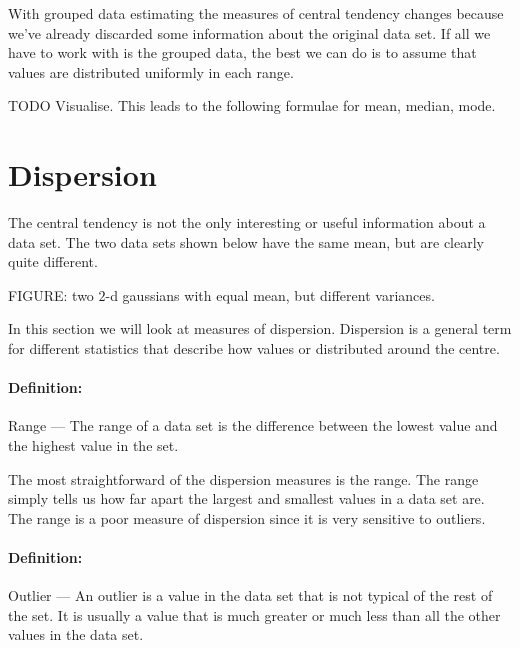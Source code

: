 \documentclass[a4paper,11pt]{report}
\def\Definition#1#2{\paragraph{Definition:} #1 --- #2}
\begin{document}
With grouped data estimating the measures of central tendency changes
because we've already discarded some information about the original
data set. If all we have to work with is the grouped data, the best we
can do is to assume that values are distributed uniformly in each
range.

TODO Visualise. This leads to the following formulae for mean,
median, mode.

\section{Dispersion}
The central tendency is not the only interesting or useful information
about a data set. The two data sets shown below have the same mean,
but are clearly quite different.

\begin{center}
  FIGURE: two $2$-d gaussians with equal mean, but different variances.
\end{center}

In this section we will look at measures of dispersion. Dispersion is
a general term for different statistics that describe how values or
distributed around the centre.

\Definition{Range}{The range of a data set is the difference between
  the lowest value and the highest value in the set.}

The most straightforward of the dispersion measures is the range. The
range simply tells us how far apart the largest and smallest values in
a data set are. The range is a poor measure of dispersion since it is
very sensitive to outliers.

\Definition{Outlier}{An outlier is a value in the data set that is not
  typical of the rest of the set. It is usually a value that is much
  greater or much less than all the other values in the data set.}
\end{document}
